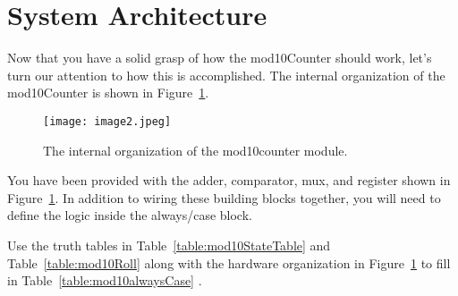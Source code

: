 \section{System Architecture}
Now that you have a solid grasp of how the mod10Counter should work,
let's turn our attention to how this is accomplished. The internal
organization of the mod10Counter is shown in Figure~\ref{fig:mod10sysArch}.
\pagebreak

\begin{figure}[ht]
    \texttt{[image: image2.jpeg]}
    \caption{The internal organization of the mod10counter module.}
    \label{fig:mod10sysArch}
\end{figure}

You have been provided with the adder, comparator, mux, and register
shown in Figure~\ref{fig:mod10sysArch}. In addition to wiring these building blocks together,
you will need to define the logic inside the always/case block.

Use the truth tables in Table~\ref{table:mod10StateTable} and Table~\ref{table:mod10Roll} along with the hardware
organization in Figure~\ref{fig:mod10sysArch} to fill in Table~\ref{table:mod10alwaysCase} .

